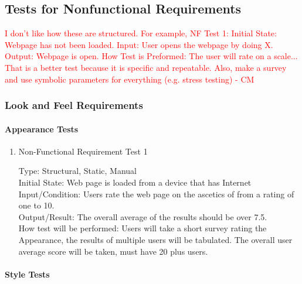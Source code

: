 \documentclass[12pt, titlepage]{article}
\begin{document}
\subsection{Tests for Nonfunctional Requirements}
\textcolor{red}{ I don't like how these are structured. For example, NF Test 1: Initial State: Webpage has not been loaded. Input: User opens the webpage by doing X. Output: Webpage is open. How Test is Preformed: The user will rate on a scale... That is a better test because it is specific and repeatable. Also, make a survey and use symbolic parameters for everything (e.g. stress testing)  - CM} \\
\subsubsection{Look and Feel Requirements}
		
\paragraph{Appearance Tests}

\begin{enumerate}

\item{Non-Functional Requirement Test 1\\}

Type: Structural, Static, Manual \\
					
Initial State: Web page is loaded from a device that has Internet \\
					
Input/Condition: Users rate the web page on the ascetics of from a rating of one to 10. \\
					
Output/Result: The overall average of the results should be over 7.5. \\
					
How test will be performed: Users will take a short survey rating the Appearance, the results of multiple users will be
tabulated. The overall user average score will be taken, must have 20 plus users. \\

\end{enumerate}
\paragraph{Style Tests}
\end{document}
